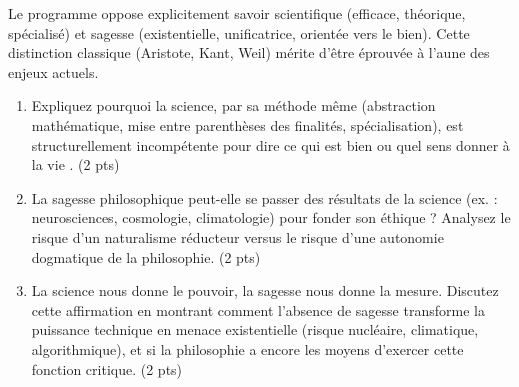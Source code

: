 \documentclass[11pt]{article}
\begin{document}
\begin{exercice}
Le programme oppose explicitement \og savoir scientifique \fg{} (efficace, théorique, spécialisé) et \og sagesse \fg{} (existentielle, unificatrice, orientée vers le bien). Cette distinction classique (Aristote, Kant, Weil) mérite d'être éprouvée à l'aune des enjeux actuels.

\begin{enumerate}
    \item Expliquez pourquoi la science, par sa méthode même (abstraction mathématique, mise entre parenthèses des finalités, spécialisation), est structurellement incompétente pour dire \og ce qui est bien \fg{} ou \og quel sens donner à la vie \fg{}. \hfill (2 pts)
    \item La sagesse philosophique peut-elle se passer des résultats de la science (ex. : neurosciences, cosmologie, climatologie) pour fonder son éthique ? Analysez le risque d'un \og naturalisme \fg{} réducteur versus le risque d'une \og autonomie \fg{} dogmatique de la philosophie. \hfill (2 pts)
    \item \og La science nous donne le pouvoir, la sagesse nous donne la mesure. \fg{} Discutez cette affirmation en montrant comment l'absence de sagesse transforme la puissance technique en menace existentielle (risque nucléaire, climatique, algorithmique), et si la philosophie a encore les moyens d'exercer cette fonction critique. \hfill (2 pts)
\end{enumerate}
\end{exercice}
\end{document}
